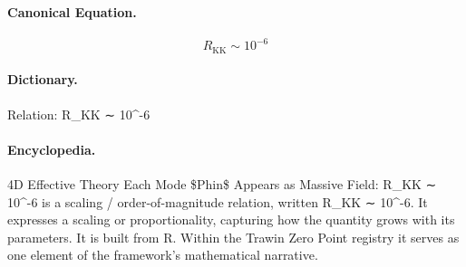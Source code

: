 \paragraph{Canonical Equation.}
\[
R_\text{KK} \sim 10^{-6}
\]

\paragraph{Dictionary.}
Relation: R\_KK ∼ 10\textasciicircum{}-6

\paragraph{Encyclopedia.}
4D Effective Theory Each Mode \$Phin\$ Appears as Massive Field: R\_KK ∼ 10\textasciicircum{}-6 is a scaling / order-of-magnitude relation, written R\_KK ∼ 10\textasciicircum{}-6. It expresses a scaling or proportionality, capturing how the quantity grows with its parameters. It is built from R. Within the Trawin Zero Point registry it serves as one element of the framework's mathematical narrative.
